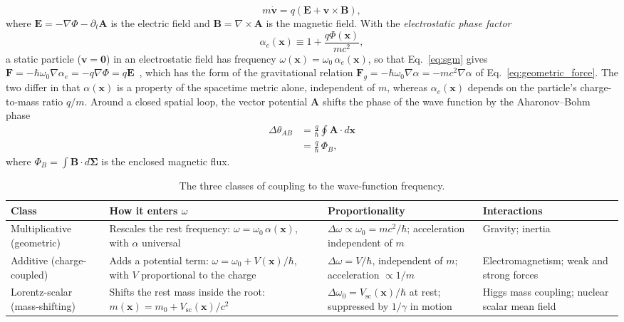 \documentclass[aps,prd,onecolumn,tightenlines,nofootinbib,notitlepage,11pt,floatfix]{revtex4-2}
\theoremstyle{indentedtheorem}
\begin{document}
\begin{equation}
    m\dot{\mathbf{v}} = q(\mathbf{E} + \mathbf{v}\times\mathbf{B}) ,
    \label{eq:lorentz}
\end{equation}
where $\mathbf{E} = -\nabla\Phi - \partial_t\mathbf{A}$ is the electric field and $\mathbf{B} = \nabla\times\mathbf{A}$ is the magnetic field. With the \emph{electrostatic phase factor}
\begin{equation}
    \alpha_e(\mathbf{x}) \equiv 1 + \frac{q\Phi(\mathbf{x})}{mc^2} ,
    \label{eq:alpha_e}
\end{equation}
a static particle ($\mathbf{v}=\mathbf{0}$) in an electrostatic field has frequency $\omega(\mathbf{x}) = \omega_0\,\alpha_e(\mathbf{x})$, so that Eq.~\eqref{eq:sgm} gives $\mathbf{F} = -\hbar\omega_0\nabla\alpha_e = -q\nabla\Phi = q\mathbf{E}$~\citep{Coulomb1785Electricity}, which has the form of the gravitational relation $\mathbf{F}_g = -\hbar\omega_0\nabla\alpha = -mc^2\nabla\alpha$ of Eq.~\eqref{eq:geometric_force}. The two differ in that $\alpha(\mathbf{x})$ is a property of the spacetime metric alone, independent of $m$, whereas $\alpha_e(\mathbf{x})$ depends on the particle's charge-to-mass ratio $q/m$. Around a closed spatial loop, the vector potential $\mathbf{A}$ shifts the phase of the wave function by the Aharonov--Bohm phase~\citep{Ehrenberg1949Refractive,Aharonov1959Significance}
\begin{align}
    \Delta\theta_{AB} &= \frac{q}{\hbar}\oint\mathbf{A}\cdot d\mathbf{x} \nonumber \\
    &= \frac{q}{\hbar}\,\Phi_B ,
    \label{eq:ab}
\end{align}
where $\Phi_B = \int\mathbf{B}\cdot d\boldsymbol{\Sigma}$ is the enclosed magnetic flux.

\begin{table}[htbp]
\centering
\caption{The three classes of coupling to the wave-function frequency.}
\label{tab:classes}
\begin{tabular}{p{2.4cm}p{4.4cm}p{3.4cm}p{3.4cm}}
\toprule
\textbf{Class} & \textbf{How it enters $\omega$} & \textbf{Proportionality} & \textbf{Interactions} \\
\midrule
Multiplicative (geometric) & Rescales the rest frequency: $\omega = \omega_0\,\alpha(\mathbf{x})$, with $\alpha$ universal & $\Delta\omega \propto \omega_0 = mc^2/\hbar$; acceleration independent of $m$ & Gravity; inertia \\
\addlinespace
Additive (charge-coupled) & Adds a potential term: $\omega = \omega_0 + V(\mathbf{x})/\hbar$, with $V$ proportional to the charge & $\Delta\omega = V/\hbar$, independent of $m$; acceleration $\propto 1/m$ & Electromagnetism; weak and strong forces \\
\addlinespace
Lorentz-scalar (mass-shifting) & Shifts the rest mass inside the root: $m(\mathbf{x}) = m_0 + V_\text{sc}(\mathbf{x})/c^2$ & $\Delta\omega_0 = V_\text{sc}(\mathbf{x})/\hbar$ at rest; suppressed by $1/\gamma$ in motion & Higgs mass coupling; nuclear scalar mean field \\
\bottomrule
\end{tabular}
\end{table}
\end{document}
